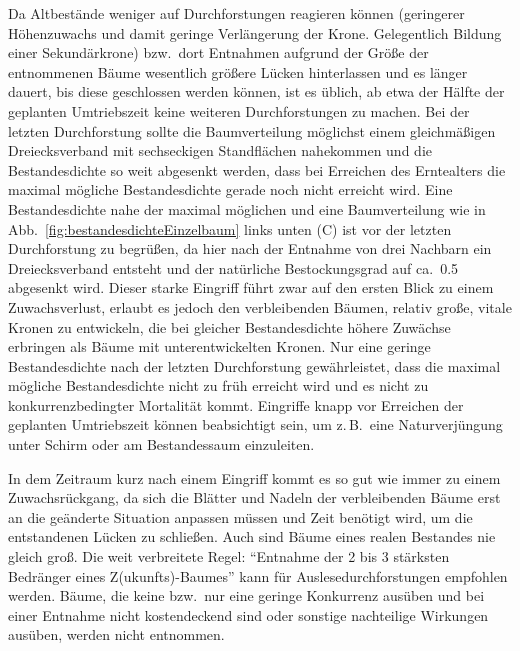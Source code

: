 \documentclass[twocolumn, paper=a4, fontsize=10pt]{scrartcl}
\begin{document}
Da Altbestände weniger auf Durchforstungen reagieren können (geringerer Höhenzuwachs und damit geringe Verlängerung der Krone. Gelegentlich Bildung einer Sekundärkrone) bzw.\ dort Entnahmen aufgrund der Größe der entnommenen Bäume wesentlich größere Lücken hinterlassen und es länger dauert, bis diese geschlossen werden können, ist es üblich, ab etwa der Hälfte der geplanten Umtriebszeit keine weiteren Durchforstungen zu machen. Bei der letzten Durchforstung sollte die Baumverteilung möglichst einem gleichmäßigen Dreiecksverband mit sechseckigen Standflächen nahekommen und die Bestandesdichte so weit abgesenkt werden, dass bei Erreichen des Erntealters die maximal mögliche Bestandesdichte gerade noch nicht erreicht wird. Eine Bestandesdichte nahe der maximal möglichen und eine Baumverteilung wie in Abb.~\ref{fig:bestandesdichteEinzelbaum} links unten (C) ist vor der letzten Durchforstung zu begrüßen, da hier nach der Entnahme von drei Nachbarn ein Dreiecksverband entsteht und der natürliche Bestockungsgrad auf ca.\ 0.5 abgesenkt wird. Dieser starke Eingriff führt zwar auf den ersten Blick zu einem Zuwachsverlust, erlaubt es jedoch den verbleibenden Bäumen, relativ große, vitale Kronen zu entwickeln, die bei gleicher Bestandesdichte höhere Zuwächse erbringen als Bäume mit unterentwickelten Kronen. Nur eine geringe Bestandesdichte nach der letzten Durchforstung gewährleistet, dass die maximal mögliche Bestandesdichte nicht zu früh erreicht wird und es nicht zu konkurrenzbedingter Mortalität kommt. Eingriffe knapp vor Erreichen der geplanten Umtriebszeit können beabsichtigt sein, um z.\,B.\ eine Naturverjüngung unter Schirm oder am Bestandessaum einzuleiten.

In dem Zeitraum kurz nach einem Eingriff kommt es so gut wie immer zu einem Zuwachsrückgang, da sich die Blätter und Nadeln der verbleibenden Bäume erst an die geänderte Situation anpassen müssen und Zeit benötigt wird, um die entstandenen Lücken zu schließen. Auch sind Bäume eines realen Bestandes nie gleich groß. Die weit verbreitete Regel: \enquote{Entnahme der 2 bis 3 stärksten Bedränger eines Z(ukunfts)-Baumes} kann für Auslesedurchforstungen empfohlen werden. Bäume, die keine bzw.\ nur eine geringe Konkurrenz ausüben und bei einer Entnahme nicht kostendeckend sind oder sonstige nachteilige Wirkungen ausüben, werden nicht entnommen.
\end{document}
